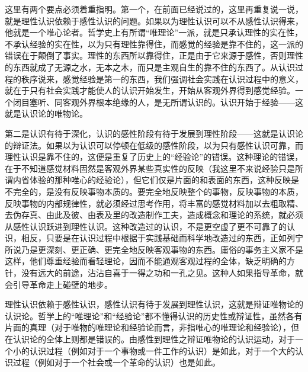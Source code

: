 这里有两个要点必须着重指明。第一个，在前面已经说过的，这里再重复说一说，就是理性认识依赖于感性认识的问题。如果以为理性认识可以不从感性认识得来，他就是一个唯心论者。哲学史上有所谓“唯理论”一派，就是只承认理性的实在性，不承认经验的实在性，以为只有理性靠得住，而感觉的经验是靠不住的，这一派的错误在于颠倒了事实。理性的东西所以靠得住，正是由于它来源于感性，否则理性的东西就成了无源之水，无本之木，而只是主观自生的靠不住的东西了。从认识过程的秩序说来，感觉经验是第一的东西，我们强调社会实践在认识过程中的意义，就在于只有社会实践才能使人的认识开始发生，开始从客观外界得到感觉经验。一个闭目塞听、同客观外界根本绝缘的人，是无所谓认识的。认识开始于经验——这就是认识论的唯物论。

第二是认识有待于深化，认识的感性阶段有待于发展到理性阶段——这就是认识论的辩证法。如果以为认识可以停顿在低级的感性阶段，以为只有感性认识可靠，而理性认识是靠不住的，这便是重复了历史上的“经验论”的错误。这种理论的错误，在于不知道感觉材料固然是客观外界某些真实性的反映（我这里不来说经验只是所谓内省体验的那种唯心的经验论），但它们仅是片面的和表面的东西，这种反映是不完全的，是没有反映事物本质的。要完全地反映整个的事物，反映事物的本质，反映事物的内部规律性，就必须经过思考作用，将丰富的感觉材料加以去粗取精、去伪存真、由此及彼、由表及里的改造制作工夫，造成概念和理论的系统，就必须从感性认识跃进到理性认识。这种改造过的认识，不是更空虚了更不可靠了的认识，相反，只要是在认识过程中根据于实践基础而科学地改造过的东西，正如列宁所说乃是更深刻、更正确、更完全地反映客观事物的东西。庸俗的事务主义家不是这样，他们尊重经验而看轻理论，因而不能通观客观过程的全体，缺乏明确的方针，没有远大的前途，沾沾自喜于一得之功和一孔之见。这种人如果指导革命，就会引导革命走上碰壁的地步。

理性认识依赖于感性认识，感性认识有待于发展到理性认识，这就是辩证唯物论的认识论。哲学上的“唯理论”和“经验论”都不懂得认识的历史性或辩证性，虽然各有片面的真理（对于唯物的唯理论和经验论而言，非指唯心的唯理论和经验论），但在认识论的全体上则都是错误的。由感性到理性之辩证唯物论的认识运动，对于一个小的认识过程（例如对于一个事物或一件工作的认识）是如此，对于一个大的认识过程（例如对于一个社会或一个革命的认识）也是如此。

